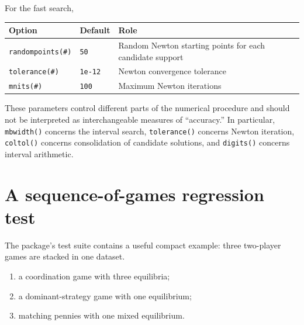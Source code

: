 \documentclass[11pt]{article}
\providecommand{\tightlist}{%
      \setlength{\itemsep}{0pt}\setlength{\parskip}{0pt}}
\begin{document}
For the fast search,

{\def\LTcaptype{none} %
\begin{longtable}[]{@{}
  >{\raggedright\arraybackslash}p{}
  >{\raggedleft\arraybackslash}p{}
  >{\raggedright\arraybackslash}p{}@{}}
\toprule\noalign{}
\begin{minipage}[b]{\linewidth}\raggedright
Option
\end{minipage} & \begin{minipage}[b]{\linewidth}\raggedleft
Default
\end{minipage} & \begin{minipage}[b]{\linewidth}\raggedright
Role
\end{minipage} \\
\midrule\noalign{}
\endhead
\bottomrule\noalign{}
\endlastfoot
\texttt{randompoints(\#)} & \texttt{50} & Random Newton starting points
for each candidate support \\
\texttt{tolerance(\#)} & \texttt{1e-12} & Newton convergence
tolerance \\
\texttt{mnits(\#)} & \texttt{100} & Maximum Newton iterations \\
\end{longtable}
}

These parameters control different parts of the numerical procedure and
should not be interpreted as interchangeable measures of ``accuracy.''
In particular, \texttt{mbwidth()} concerns the interval search,
\texttt{tolerance()} concerns Newton iteration, \texttt{coltol()}
concerns consolidation of candidate solutions, and \texttt{digits()}
concerns interval arithmetic.

    \section{A sequence-of-games regression
test}\label{a-sequence-of-games-regression-test}

The package's test suite contains a useful compact example: three
two-player games are stacked in one dataset.

\begin{enumerate}
\def\labelenumi{\arabic{enumi}.}
\tightlist
\item
  a coordination game with three equilibria;
\item
  a dominant-strategy game with one equilibrium;
\item
  matching pennies with one mixed equilibrium.
\end{enumerate}
\end{document}
